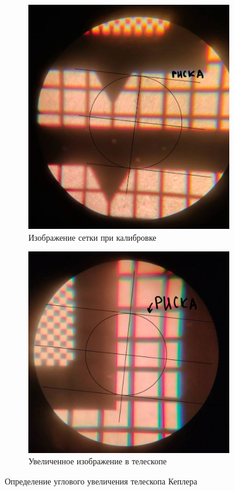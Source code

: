 \begin{figure}[h!]
    \centering
    \begin{subfigure}{0.45\linewidth}
        \centering
        \includegraphics[width=9cm]{images/calibrate.jpg}
        \caption{Изображение сетки при калибровке}
    \end{subfigure}
    \hfill
    \begin{subfigure}{0.45\linewidth}
        \centering
        \includegraphics[width=9cm]{images/kepler_image.jpg}
        \caption{Увеличенное изображение в телескопе}
    \end{subfigure}
    \caption{Определение углового увеличения телескопа Кеплера}
\end{figure}

\newpage

